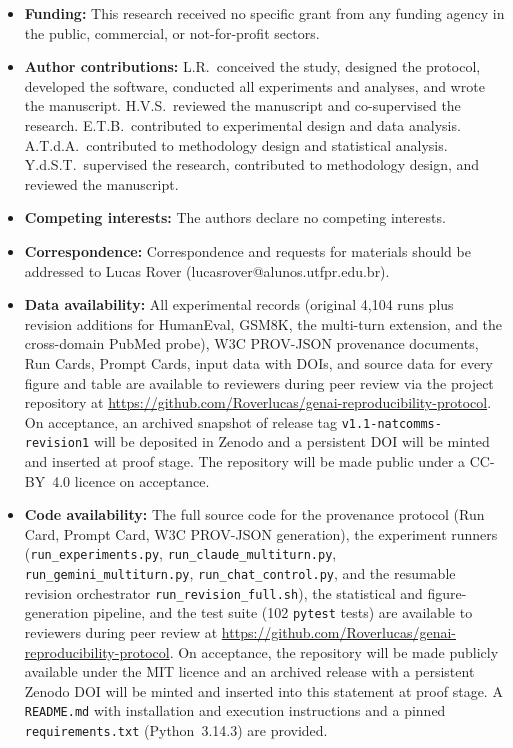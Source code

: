 \documentclass[sn-nature]{sn-jnl}
\begin{document}
\begin{itemize}
\item \textbf{Funding:}
This research received no specific grant from any funding agency in the public, commercial, or not-for-profit sectors.

\item \textbf{Author contributions:}
L.R.\ conceived the study, designed the protocol, developed the software, conducted all experiments and analyses, and wrote the manuscript.
H.V.S.\ reviewed the manuscript and co-supervised the research.
E.T.B.\ contributed to experimental design and data analysis.
A.T.d.A.\ contributed to methodology design and statistical analysis.
Y.d.S.T.\ supervised the research, contributed to methodology design, and reviewed the manuscript.

\item \textbf{Competing interests:}
The authors declare no competing interests.

\item \textbf{Correspondence:}
Correspondence and requests for materials should be addressed to Lucas Rover (lucasrover@alunos.utfpr.edu.br).

\item \textbf{Data availability:}
All experimental records (original 4{,}104 runs plus revision additions for HumanEval, GSM8K, the multi-turn extension, and the cross-domain PubMed probe), W3C PROV-JSON provenance documents, Run Cards, Prompt Cards, input data with DOIs, and source data for every figure and table are available to reviewers during peer review via the project repository at \url{https://github.com/Roverlucas/genai-reproducibility-protocol}. On acceptance, an archived snapshot of release tag \texttt{v1.1-natcomms-revision1} will be deposited in Zenodo and a persistent DOI will be minted and inserted at proof stage. The repository will be made public under a CC-BY~4.0 licence on acceptance.

\item \textbf{Code availability:}
The full source code for the provenance protocol (Run Card, Prompt Card, W3C PROV-JSON generation), the experiment runners (\texttt{run\_experiments.py}, \texttt{run\_claude\_multiturn.py}, \texttt{run\_gemini\_multiturn.py}, \texttt{run\_chat\_control.py}, and the resumable revision orchestrator \texttt{run\_revision\_full.sh}), the statistical and figure-generation pipeline, and the test suite (102 \texttt{pytest} tests) are available to reviewers during peer review at \url{https://github.com/Roverlucas/genai-reproducibility-protocol}. On acceptance, the repository will be made publicly available under the MIT licence and an archived release with a persistent Zenodo DOI will be minted and inserted into this statement at proof stage. A \texttt{README.md} with installation and execution instructions and a pinned \texttt{requirements.txt} (Python~3.14.3) are provided.
\end{itemize}
\end{document}
